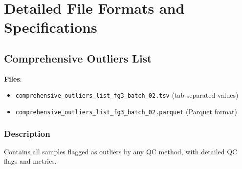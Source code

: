 \documentclass[11pt,a4paper]{article}
\begin{document}
\section{Detailed File Formats and Specifications}
\label{sec:detailed_formats}

\subsection{Comprehensive Outliers List}

\textbf{Files}:
\begin{itemize}
\item \texttt{comprehensive\_outliers\_list\_fg3\_batch\_02.tsv} (tab-separated values)
\item \texttt{comprehensive\_outliers\_list\_fg3\_batch\_02.parquet} (Parquet format)
\end{itemize}

\subsubsection{Description}
Contains all samples flagged as outliers by any QC method, with detailed QC flags and metrics.
\end{document}
